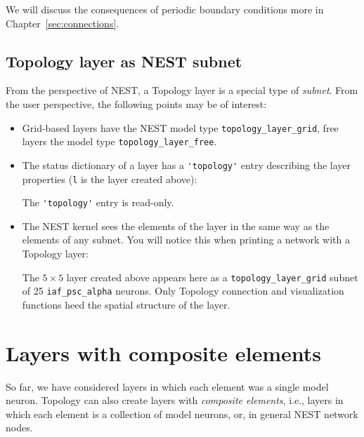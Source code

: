 \documentclass[a4paper,12pt]{report}
\begin{document}
We will discuss the consequences of periodic boundary conditions more
in Chapter~\ref{sec:connections}.

\subsection{Topology layer as NEST subnet}\label{sec:subnet}

From the perspective of NEST, a Topology layer is a special type of
\emph{subnet}. From the user perspective, the following
points may be of interest:
\begin{itemize}
\item Grid-based layers have the NEST model type
  \lstinline!topology_layer_grid!, free
  layers the model type
  \lstinline!topology_layer_free!.
\item The status dictionary of a layer has a \lstinline!'topology'!
  entry describing the layer properties (\lstinline!l! is the layer
  created above):
%


%
The \lstinline!'topology'! entry is read-only.
\item The NEST kernel sees the elements of the layer in the same way
  as the elements of any subnet. You will notice this when printing a
  network with a Topology layer:
%


%
The $5\times 5$ layer created above appears here as a
\lstinline!topology_layer_grid! subnet of 25 \lstinline!iaf_psc_alpha!
neurons.
Only Topology connection and visualization functions heed the spatial
structure of the layer.
\end{itemize}

\section{Layers with composite elements}\label{sec:composite_layers}

So far, we have considered layers in which each element was a single
model neuron. Topology can also create layers with \emph{composite
  elements}, i.e., layers in which each
element is a collection of model neurons, or, in
general NEST network nodes.
\end{document}
